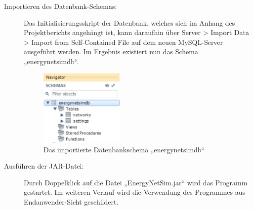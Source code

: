 \documentclass[12pt,titlepage]{article}
\begin{document}
\begin{description}
\begin{figure}[!ht]
	\label{fig:ErgSoftwareInst2}
\end{figure}
\item [Importieren des Datenbank-Schemas:] Das Initialisierungsskript der Datenbank, welches sich im Anhang des Projektberichts angehängt ist, kann daraufhin über Server > Import Data > Import from Self-Contained File auf dem neuen MySQL-Server ausgeführt werden. Im Ergebnis existiert nun das Schema „energynetsimdb“.
\begin{figure}[!ht]
	\centering
	\includegraphics[width=0.4\textwidth]{ErgSoftwareInst4}
	\caption{Das importierte Datenbankschema „energynetsimdb“}
	\label{fig:ErgSoftwareInst4}
\end{figure}
\item [Ausführen der JAR-Datei:] Durch Doppelklick auf die Datei „EnergyNetSim.jar“ wird das Programm gestartet. Im weiteren Verlauf wird die Verwendung des Programmes aus Endanwender-Sicht geschildert.
\end{description}
\end{document}
